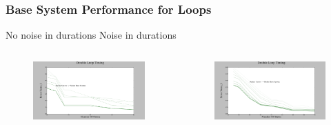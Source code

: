 \documentclass{beamer}
\begin{document}


\begin{frame}
\frametitle{Base System Performance for Loops}




\hspace{1cm}No noise in durations
\hspace{3cm}Noise in durations

\begin{columns}[c]

\begin{figure}

\includegraphics[width=1.0\linewidth]{lucasplots/monImages/DoubleLoopTiming0.png}
\end{figure}

\begin{figure}
\includegraphics[width=1.0\linewidth]{lucasplots/monImages/DoubleLoopTiming0_1.png}
\end{figure}


\end{columns}
\end{frame}
\end{document}
